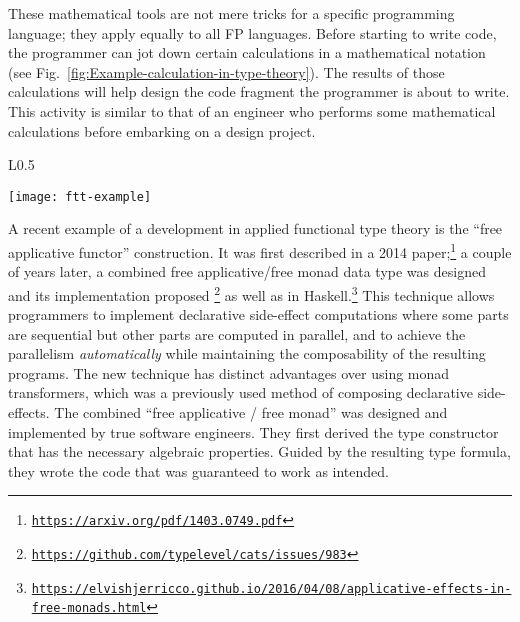 These mathematical tools are not mere tricks for a specific programming
language; they apply equally to all FP languages. Before starting
to write code, the programmer can jot down certain calculations in
a mathematical notation (see Fig.\ \ref{fig:Example-calculation-in-type-theory}).
The results of those calculations will help design the code fragment
the programmer is about to write. This activity is similar to that
of an engineer who performs some mathematical calculations before
embarking on a design project. \begin{wrapfigure}{L}{0.5\textwidth}%
\begin{centering}
{\footnotesize{}\vspace{0.25\baselineskip}
\texttt{[image: ftt-example]}\vspace{-0.25\baselineskip}
}{\footnotesize\par}
\par\end{centering}
{\footnotesize{}\caption{A programmer performs a derivation before writing Haskell code.\label{fig:Example-calculation-in-type-theory}}
}{\footnotesize\par}

\vspace{-0.5\baselineskip}
\end{wrapfigure}%
 

A recent example of a development in applied functional type theory
is the \textsf{``}free applicative functor\textsf{''} construction. It was first described
in a 2014 paper;\footnote{\texttt{\href{https://arxiv.org/pdf/1403.0749.pdf}{https://arxiv.org/pdf/1403.0749.pdf}}}
a couple of years later, a combined free applicative/free monad data
type was designed and its implementation proposed \footnote{\texttt{\href{https://github.com/typelevel/cats/issues/983}{https://github.com/typelevel/cats/issues/983}}}
as well as in Haskell.\footnote{\texttt{\href{https://elvishjerricco.github.io/2016/04/08/applicative-effects-in-free-monads.html}{https://elvishjerricco.github.io/2016/04/08/applicative-effects-in-free-monads.html}}}
This technique allows programmers to implement declarative side-effect
computations where some parts are sequential but other parts are computed
in parallel, and to achieve the parallelism \emph{automatically} while
maintaining the composability of the resulting programs. The new technique
has distinct advantages over using monad transformers, which was a
previously used method of composing declarative side-effects. The
combined \textsf{``}free applicative / free monad\textsf{''} was designed and implemented
by true software engineers. They first derived the type constructor
that has the necessary algebraic properties. Guided by the resulting
type formula, they wrote the code that was guaranteed to work as intended.

